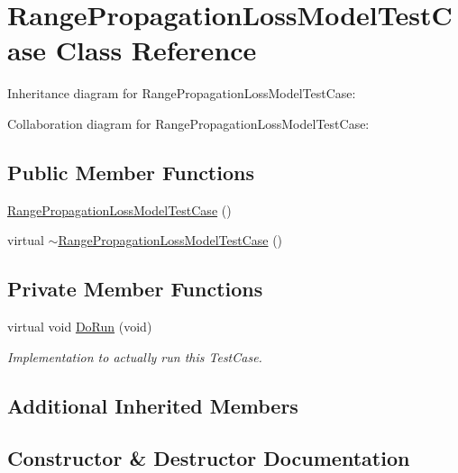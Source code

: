 \hypertarget{classRangePropagationLossModelTestCase}{}\section{Range\+Propagation\+Loss\+Model\+Test\+Case Class Reference}
\label{classRangePropagationLossModelTestCase}


Inheritance diagram for Range\+Propagation\+Loss\+Model\+Test\+Case\+:


Collaboration diagram for Range\+Propagation\+Loss\+Model\+Test\+Case\+:
\subsection*{Public Member Functions}
\begin{DoxyCompactItemize}
\item 
\hyperlink{classRangePropagationLossModelTestCase_a6f52cdca86160dca817706d7e661fef7}{Range\+Propagation\+Loss\+Model\+Test\+Case} ()
\item 
virtual \hyperlink{classRangePropagationLossModelTestCase_a5c1be0a01b3b1053e9bcd08d81c13525}{$\sim$\+Range\+Propagation\+Loss\+Model\+Test\+Case} ()
\end{DoxyCompactItemize}
\subsection*{Private Member Functions}
\begin{DoxyCompactItemize}
\item 
virtual void \hyperlink{classRangePropagationLossModelTestCase_ad34c21db53296e3cb16176b801dbe71c}{Do\+Run} (void)
\begin{DoxyCompactList}\small\item\em Implementation to actually run this Test\+Case. \end{DoxyCompactList}\end{DoxyCompactItemize}
\subsection*{Additional Inherited Members}


\subsection{Constructor \& Destructor Documentation}

